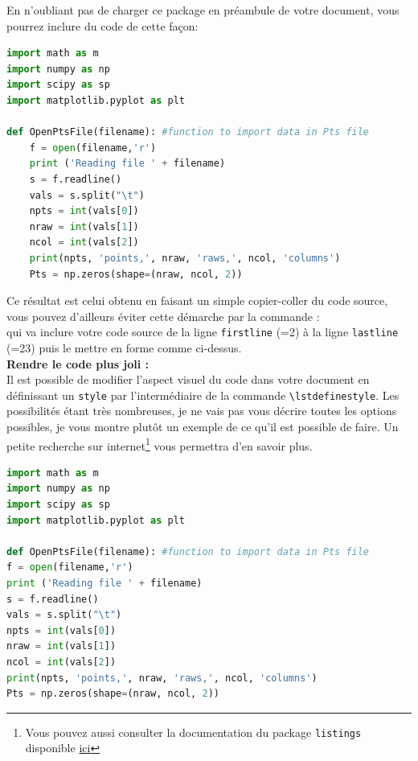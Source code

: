 \documentclass[11pt]{article}				%
\begin{document}
En n'oubliant pas de charger ce package en préambule de votre document, vous pourrez inclure du code de cette façon:

\begin{lstlisting}[language=Python]
import math as m
import numpy as np
import scipy as sp
import matplotlib.pyplot as plt

def OpenPtsFile(filename): #function to import data in Pts file
	f = open(filename,'r')
	print ('Reading file ' + filename)
	s = f.readline()
	vals = s.split("\t")
	npts = int(vals[0])
	nraw = int(vals[1])
	ncol = int(vals[2])
	print(npts, 'points,', nraw, 'raws,', ncol, 'columns')
	Pts = np.zeros(shape=(nraw, ncol, 2))
\end{lstlisting}

Ce résultat est celui obtenu en faisant un simple copier-coller du code source, vous pouvez d'ailleurs éviter cette démarche par la commande :\\
 \verb|| qui va inclure votre code source de la ligne \texttt{firstline} (=2) à la ligne \texttt{lastline} (=23) puis le mettre en forme comme ci-dessus.\\

\textbf{Rendre le code plus joli :}\\

Il est possible de modifier l'aspect visuel du code dans votre document en définissant un \texttt{style} par l'intermédiaire de la commande \verb|\lstdefinestyle|. Les possibilités étant très nombreuses, je ne vais pas vous décrire toutes les options possibles, je vous montre plutôt un exemple de ce qu'il est possible de faire. Un petite recherche sur internet\footnote{Vous pouvez aussi consulter la documentation du package \texttt{listings} disponible \href{https://ctan.gutenberg.eu.org/macros/latex/contrib/listings/listings.pdf}{ici}} vous permettra d'en savoir plus.\\

\lstset{style=mystyle}
\begin{lstlisting}[language=Python]
import math as m
import numpy as np
import scipy as sp
import matplotlib.pyplot as plt

def OpenPtsFile(filename): #function to import data in Pts file
f = open(filename,'r')
print ('Reading file ' + filename)
s = f.readline()
vals = s.split("\t")
npts = int(vals[0])
nraw = int(vals[1])
ncol = int(vals[2])
print(npts, 'points,', nraw, 'raws,', ncol, 'columns')
Pts = np.zeros(shape=(nraw, ncol, 2))
\end{lstlisting}  
\end{document}
